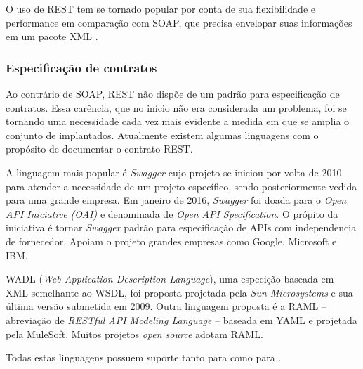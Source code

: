 O uso de REST tem se tornado popular por conta de sua flexibilidade e
performance em comparação com SOAP, que precisa envelopar suas informações em
um pacote XML \cite{mumbaikar2013web}. 

\subsubsection{Especificação de contratos}
\vspace{-6mm}

Ao contrário de SOAP, REST não dispõe de um padrão para especificação de
contratos. Essa carência, que no início não era considerada um problema, foi se
tornando uma necessidade cada vez mais evidente a medida em que se amplia o
conjunto de \ws{} implantados. Atualmente existem algumas linguagens com o
propósito de documentar o contrato REST.

A linguagem mais popular é \textit{Swagger} cujo projeto se iniciou por volta de
2010 para atender a necessidade de um projeto específico, sendo posteriormente
vedida para uma grande empresa. Em janeiro de 2016, \textit{Swagger} foi doada
para o \textit{Open API Iniciative (OAI)} e denominada de \textit{Open API
Specification}. O própito da iniciativa é tornar \textit{Swagger} padrão para
especificação de APIs com independencia de fornecedor. Apoiam o projeto grandes
empresas como Google, Microsoft e IBM.

WADL (\textit{Web Application Description Language}), uma especição baseada em
XML semelhante ao WSDL, foi proposta projetada pela \textit{Sun Microsystems} e
sua última versão submetida em 2009. Outra linguagem proposta é a RAML --
abreviação de \textit{RESTful API Modeling Language} -- baseada em YAML e
projetada pela MuleSoft. Muitos projetos \textit{open source} adotam RAML.

Todas estas linguagens possuem suporte tanto para \CdFirst{} como para
\CtFirst{} \cite{wideberg2015restful}.




\section{\designbycontract{}}
\label{Design-by-Contract}
\vspace{-6mm}

